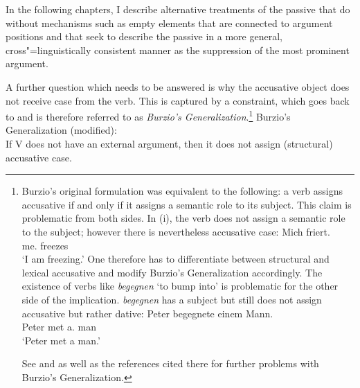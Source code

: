 In the following chapters, I describe alternative treatments of the passive that do without mechanisms such as
empty elements that are connected to argument positions and that seek to describe the passive in a more
general, cross"=linguistically consistent manner as the suppression of the most prominent argument.

A further question which needs to be answered is why the accusative object does not receive case from the verb.
This is captured by a constraint, which goes back to \citet[--185]{Burzio86a-u-gekauft} and is therefore
referred to as \emph{Burzio's Generalization}.\footnote{%
Burzio's original formulation was equivalent to the following: a verb assigns accusative if and only if it assigns
a semantic role to its subject.
This claim is problematic from both sides. In (i), the verb does not assign a semantic role to the subject; however
there is nevertheless accusative case:
\ea
\gll Mich friert.\\
	 me.\acc{} freezes\\
\glt `I am freezing.'
\z
One therefore has to differentiate between structural and lexical accusative and modify Burzio's Generalization
accordingly. The existence of verbs like \emph{begegnen} `to bump into' is problematic for the other side of
the implication. \emph{begegnen} has a subject but still does not assign accusative but rather
dative:
\ea
\gll Peter begegnete einem Mann.\\
     Peter met a.\dat{} man\\
\glt `Peter met a man.'
\z

See  and  as well as the references cited there for further problems
with Burzio's Generalization.
}
\largerpage
\ea
Burzio's Generalization (modified):\\
If V does not have an external argument, then it does not assign (structural) accusative case.
\z

